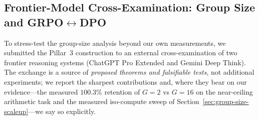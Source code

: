 %

\subsection{Frontier-Model Cross-Examination: Group Size and \texorpdfstring{GRPO$\leftrightarrow$DPO}{GRPO <-> DPO}}
\label{sec:frontier-group-size}

To stress-test the group-size analysis beyond our own measurements, we
submitted the Pillar~3 construction to an external cross-examination of
two frontier reasoning systems (ChatGPT Pro Extended and Gemini Deep
Think). The exchange is a source of \emph{proposed theorems and
falsifiable tests}, not additional experiments; we report the sharpest
contributions and, where they bear on our evidence---the measured
$100.3\%$ retention of $G{=}2$ vs $G{=}16$ on the near-ceiling
arithmetic task and the measured iso-compute sweep of
Section~\ref{sec:group-size-scaleup}---we say so explicitly.

